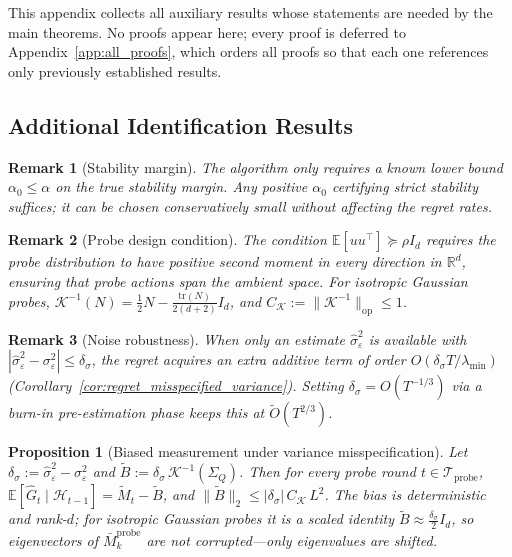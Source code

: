 \documentclass{article}
\newcommand{\R}{\mathbb{R}}
\newcommand{\E}{\mathbb{E}}
\newcommand{\op}{\mathrm{op}}
\newcommand{\cH}{\mathcal{H}}
\newcommand{\cTprobe}{\mathcal{T}_{\mathrm{probe}}}
\newcommand{\tr}{\mathrm{tr}}
\newtheorem{proposition}{Proposition}
\newtheorem{remark}{Remark}
\begin{document}
This appendix collects all auxiliary results whose statements are needed by the main theorems.
No proofs appear here; every proof is deferred to Appendix~\ref{app:all_proofs}, which orders all proofs so that each one references only previously established results.

\subsection{Additional Identification Results}
\label{app:omitted_identification}

\begin{remark}[Stability margin]
\label{rem:stability_margin}
The algorithm only requires a known lower bound $\alpha_0 \le \alpha$ on the true stability margin.
Any positive $\alpha_0$ certifying strict stability suffices; it can be chosen conservatively small without affecting the regret rates.
\end{remark}

\begin{remark}[Probe design condition]
\label{rem:probe_design}
The condition $\E[uu^\top] \succeq \rho I_d$ requires the probe distribution to have positive second moment in every direction in $\R^d$, ensuring that probe actions span the ambient space.
For isotropic Gaussian probes, $\mathcal{K}^{-1}(N) = \frac{1}{2}N - \frac{\tr(N)}{2(d+2)} I_d$, and $C_{\mathcal K} := \|\mathcal{K}^{-1}\|_{\op} \le 1$.
\end{remark}

\begin{remark}[Noise robustness]
\label{rem:noise_robustness}
When only an estimate $\hat\sigma_\varepsilon^2$ is available with $|\hat\sigma_\varepsilon^2 - \sigma_\varepsilon^2| \le \delta_\sigma$, the regret acquires an extra additive term of order $O(\delta_\sigma T/\lambda_{\min})$ (Corollary~\ref{cor:regret_misspecified_variance}).
Setting $\delta_\sigma = O(T^{-1/3})$ via a burn-in pre-estimation phase keeps this at $\widetilde O(T^{2/3})$.
\end{remark}

\begin{proposition}[Biased measurement under variance misspecification]
\label{prop:biased_measurement}
Let $\delta_\sigma := \hat\sigma_\varepsilon^2 - \sigma_\varepsilon^2$ and $\widetilde B := \delta_\sigma\,\mathcal K^{-1}(\Sigma_Q)$.
Then for every probe round $t\in\cTprobe$,
$\E[\hat G_t \mid \cH_{t-1}] = \widetilde M_t - \widetilde B$,
and $\|\widetilde B\|_2 \le |\delta_\sigma|\,C_{\mathcal K}\,L^2$.
The bias is deterministic and rank-$d$; for isotropic Gaussian probes it is a scaled identity $\widetilde B \approx \frac{\delta_\sigma}{2}I_d$, so eigenvectors of $\bar M_k^{\mathrm{probe}}$ are not corrupted---only eigenvalues are shifted.
\end{proposition}
\end{document}
